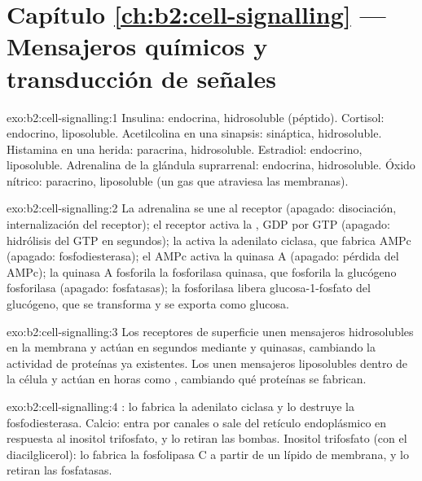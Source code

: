\section*{Capítulo \ref{ch:b2:cell-signalling} --- Mensajeros químicos y transducción de señales}

\begin{solution}{exo:b2:cell-signalling:1}
Insulina: endocrina, hidrosoluble (péptido). Cortisol: endocrino,
liposoluble. Acetilcolina en una sinapsis: sináptica, hidrosoluble.
Histamina en una herida: paracrina, hidrosoluble. Estradiol:
endocrino, liposoluble. Adrenalina de la glándula suprarrenal: endocrina,
hidrosoluble. Óxido nítrico: paracrino, liposoluble (un gas que
atraviesa las membranas).
\end{solution}

\begin{solution}{exo:b2:cell-signalling:2}
La adrenalina se une al receptor (apagado: disociación, internalización
del receptor); el receptor activa la , GDP por GTP (apagado:
hidrólisis del GTP en segundos); la  activa la adenilato ciclasa,
que fabrica AMPc (apagado: fosfodiesterasa); el AMPc activa la quinasa A
(apagado: pérdida del AMPc); la quinasa A fosforila la fosforilasa quinasa,
que fosforila la glucógeno fosforilasa (apagado: fosfatasas); la
fosforilasa libera glucosa-1-fosfato del glucógeno, que se transforma y
se exporta como glucosa.
\end{solution}

\begin{solution}{exo:b2:cell-signalling:3}
Los receptores de superficie unen mensajeros hidrosolubles en la membrana y
actúan en segundos mediante  y quinasas, cambiando la
actividad de proteínas ya existentes. Los  unen
mensajeros liposolubles dentro de la célula y actúan en horas como
, cambiando qué proteínas se fabrican.
\end{solution}

\begin{solution}{exo:b2:cell-signalling:4}
: lo fabrica la adenilato ciclasa y lo destruye la
fosfodiesterasa. Calcio: entra por canales o sale del retículo
endoplásmico en respuesta al inositol trifosfato, y lo retiran las
bombas. Inositol trifosfato (con el diacilglicerol): lo fabrica la
fosfolipasa C a partir de un lípido de membrana, y lo retiran las fosfatasas.
\end{solution}

